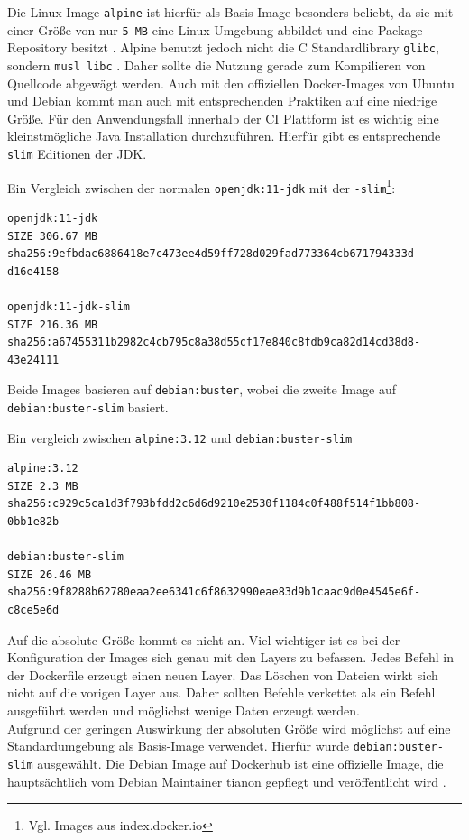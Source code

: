 Die Linux-Image \lstinline{alpine} ist hierfür als Basis-Image besonders beliebt, da sie mit einer Größe von nur \lstinline{5 MB} eine Linux-Umgebung abbildet und eine Package-Repository besitzt \cite{docker-alpine}. Alpine benutzt jedoch nicht die C Standardlibrary \lstinline{glibc}, sondern \lstinline{musl libc} \cite{alpine-about}. Daher sollte die Nutzung gerade zum Kompilieren von Quellcode abgewägt werden.
Auch mit den offiziellen Docker-Images von Ubuntu und Debian kommt man auch mit entsprechenden Praktiken auf eine niedrige Größe. Für den Anwendungsfall innerhalb der \ac{CI} Plattform ist es wichtig eine kleinstmögliche Java Installation durchzuführen. Hierfür gibt es entsprechende \lstinline{slim} Editionen der JDK. 

Ein Vergleich zwischen der normalen \lstinline{openjdk:11-jdk} mit der \lstinline{-slim}\footnote{Vgl. Images aus index.docker.io}:
\begin{verbatim}
openjdk:11-jdk
SIZE 306.67 MB
sha256:9efbdac6886418e7c473ee4d59ff728d029fad773364cb671794333d-
d16e4158

openjdk:11-jdk-slim
SIZE 216.36 MB
sha256:a67455311b2982c4cb795c8a38d55cf17e840c8fdb9ca82d14cd38d8-
43e24111
\end{verbatim}

Beide Images basieren auf \lstinline{debian:buster}, wobei die zweite Image auf \lstinline{debian:buster-slim} basiert.

Ein vergleich zwischen \lstinline{alpine:3.12} und \lstinline{debian:buster-slim}
\begin{verbatim}
alpine:3.12
SIZE 2.3 MB
sha256:c929c5ca1d3f793bfdd2c6d6d9210e2530f1184c0f488f514f1bb808-
0bb1e82b

debian:buster-slim
SIZE 26.46 MB
sha256:9f8288b62780eaa2ee6341c6f8632990eae83d9b1caac9d0e4545e6f-
c8ce5e6d
\end{verbatim}

Auf die absolute Größe kommt es nicht an. Viel wichtiger ist es bei der Konfiguration der Images sich genau mit den Layers zu befassen. Jedes Befehl in der Dockerfile erzeugt einen neuen Layer. Das Löschen von Dateien wirkt sich nicht auf die vorigen Layer aus. Daher sollten Befehle verkettet als ein Befehl ausgeführt werden und möglichst wenige Daten erzeugt werden. 
\medskip
\\
Aufgrund der geringen Auswirkung der absoluten Größe wird möglichst auf eine Standardumgebung als Basis-Image verwendet. Hierfür wurde \lstinline{debian:buster-slim} ausgewählt. Die Debian Image auf Dockerhub ist eine offizielle Image, die hauptsächtlich vom Debian Maintainer tianon gepflegt und veröffentlicht wird \cite{docker-debian-builds, docker-debian}.

